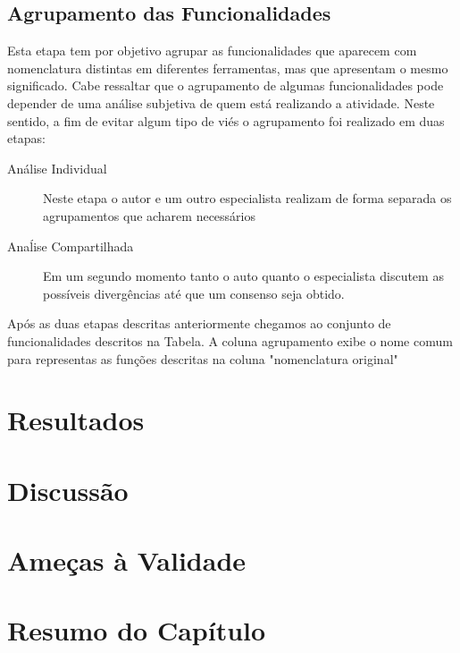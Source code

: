 \subsection{Agrupamento das Funcionalidades}
\label{ssub:Agrupamento das Funcionalidades}

Esta etapa tem por objetivo agrupar as funcionalidades que aparecem com
nomenclatura distintas em diferentes ferramentas, mas que apresentam o mesmo
significado. Cabe ressaltar que o agrupamento de algumas funcionalidades pode
depender de uma análise subjetiva de quem está realizando a atividade.  Neste
sentido, a fim de evitar algum tipo de viés o agrupamento foi realizado em duas
etapas:

\begin{description}
	\item[Análise Individual] Neste etapa o autor e um outro especialista
		realizam de forma separada os agrupamentos que acharem necessários
	\item[Anaĺise Compartilhada] Em um segundo momento tanto o auto quanto o
		especialista discutem as possíveis divergências até que um consenso seja
		obtido.
\end{description}

Após as duas etapas descritas anteriormente chegamos ao conjunto de
funcionalidades descritos na Tabela. A coluna agrupamento exibe o nome comum
para representas as funções descritas na coluna "nomenclatura original"


\section{Resultados}
\label{sec:resultados}



\section{Discussão}
\label{sec:discussao}

\section{Ameças à Validade}
\label{sec:ameacas_a_validade}


\section{Resumo do Capítulo}
\label{sec:resumo_do_capitulo}